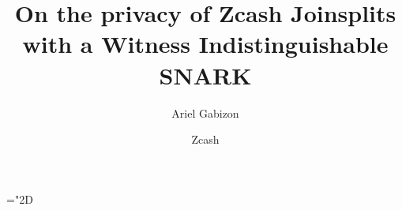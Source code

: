 \documentclass[11pt]{article}
\title{%
On the privacy of Zcash Joinsplits with a Witness Indistinguishable SNARK}
\author{Ariel Gabizon}
\date{Zcash}
\numberwithin{equation}{section} %
\numberwithin{figure}{section} %
\newcommand{\set}[1]{\ensuremath{\left\{#1\right\}}\xspace}
\begin{document}
\maketitle
 \mathchardef\mhyphen="2D

\newcommand{\grouppair}{\ensuremath{G^*}\xspace}

\newcommand{\Gt}{\ensuremath{{\mathbb G}_t}\xspace}
\newcommand{\F}{\ensuremath{{\mathbb F}_r}\xspace}
\newcommand{\help}[1]{$#1$-helper\xspace}
\newcommand{\randompair}[1]{\ensuremath{\mathsf{randomPair}(#1)}\xspace}
\newcommand{\pair}[1]{$#1$-pair\xspace}
\newcommand{\pairs}[1]{$#1$-pairs\xspace}
\newcommand{\pubvalsOf}[1]{\ensuremath{\mathrm{pub}(#1)}\xspace}
\newcommand{\pairone}[1]{\G1-$#1$-pair\xspace}
\newcommand{\pairtwo}[1]{\G2-$#1$-pair\xspace}
\newcommand{\sameratio}[2]{\ensuremath{\mathsf{SameRatio}(#1,#2)}\xspace}
\newcommand{\vecc}[2]{\ensuremath{(#1)_{#2}}\xspace}
\newcommand{\players}{\ensuremath{[n]}\xspace}
\newcommand{\ci}{\ensuremath{\mathrm{CI}}\xspace}
\newcommand{\pairvec}[1]{$#1$-vector\xspace}
\newcommand{\Fq}{\ensuremath{\mathbb{F}_q}\xspace}
\newcommand{\sigscheme}{\ensuremath{\mathscr S}\xspace}

\newcommand{\randpair}[1]{\ensuremath{\mathsf{rp}_{#1}}\xspace}
\newcommand{\randpairone}[1]{\ensuremath{\mathsf{rp}_{#1}^{1}}\xspace}

\newcommand{\randpairtwo}[1]{\ensuremath{\mathsf{rp_{#1}^2}}\xspace}%

\newcommand{\pos}{\ensuremath{\mathsf{pos}}\xspace}
\newcommand{\rej}{\ensuremath{\mathsf{rej}}\xspace}
\newcommand{\acc}{\ensuremath{\mathsf{acc}}\xspace}
\newcommand{\sha}[1]{\ensuremath{\mathsf{COMMIT}(#1)}\xspace}
 \newcommand{\shaa}{\ensuremath{\mathsf{COMMIT}}\xspace}
 \newcommand{\comm}[1]{\ensuremath{\mathsf{comm}_{#1}}\xspace}
 \newcommand{\defeq}{:=}

\newcommand{\A}{\ensuremath{\vec{A}}\xspace}
\newcommand{\B}{\ensuremath{\vec{B}}\xspace}
\newcommand{\C}{\ensuremath{\vec{C}}\xspace}
\newcommand{\Btwo}{\ensuremath{\vec{B_2}}\xspace}
\newcommand{\treevecsimp}{\ensuremath{(\tau,\rho_A,\rho_A \rho_B,\rho_A\alpha_A,\rho_A\rho_B\alpha_B, \rho_A\rho_B\alpha_C,\beta,\beta\gamma)}\xspace}%
\newcommand{\rcptc}{random-coefficient subprotocol\xspace}
\newcommand{\rcptcparams}[2]{\ensuremath{\mathrm{RCPC}(#1,#2)}\xspace}
\newcommand{\verifyrcptcparams}[2]{\ensuremath{\mathrm{\mathsf{verify}RCPC}(#1,#2)}\xspace}
\end{document}
